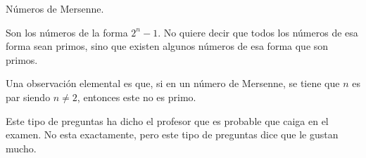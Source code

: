 










































Números de Mersenne.

Son los números de la forma $2^n - 1$. No quiere decir que todos los números
de esa forma sean primos, sino que existen algunos números de esa forma que
son primos.

Una observación elemental es que, si en un número de Mersenne, se tiene que
$n$ es par siendo $n \neq 2$, entonces este no es primo.

Este tipo de preguntas ha dicho el profesor que es probable que caiga en el
examen. No esta exactamente, pero este tipo de preguntas dice que le gustan
mucho.
